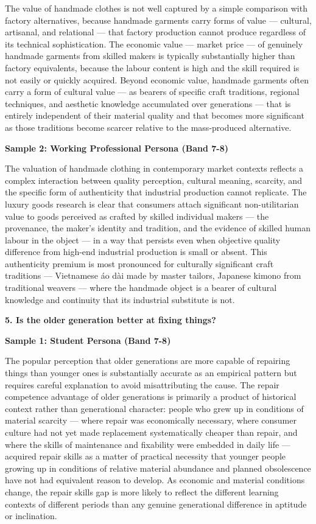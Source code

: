 The value of handmade clothes is not well captured by a simple comparison with factory alternatives, because handmade garments carry forms of value — cultural, artisanal, and relational — that factory production cannot produce regardless of its technical sophistication. The economic value — market price — of genuinely handmade garments from skilled makers is typically substantially higher than factory equivalents, because the labour content is high and the skill required is not easily or quickly acquired. Beyond economic value, handmade garments often carry a form of cultural value — as bearers of specific craft traditions, regional techniques, and aesthetic knowledge accumulated over generations — that is entirely independent of their material quality and that becomes more significant as those traditions become scarcer relative to the mass-produced alternative.

\textbf{Sample 2: Working Professional Persona (Band 7-8)}

The valuation of handmade clothing in contemporary market contexts reflects a complex interaction between quality perception, cultural meaning, scarcity, and the specific form of authenticity that industrial production cannot replicate. The luxury goods research is clear that consumers attach significant non-utilitarian value to goods perceived as crafted by skilled individual makers — the provenance, the maker's identity and tradition, and the evidence of skilled human labour in the object — in a way that persists even when objective quality difference from high-end industrial production is small or absent. This authenticity premium is most pronounced for culturally significant craft traditions — Vietnamese áo dài made by master tailors, Japanese kimono from traditional weavers — where the handmade object is a bearer of cultural knowledge and continuity that its industrial substitute is not.

\separator

\begin{ieltsquestion}
\textbf{5. Is the older generation better at fixing things?}
\end{ieltsquestion}
\textbf{Sample 1: Student Persona (Band 7-8)}

The popular perception that older generations are more capable of repairing things than younger ones is substantially accurate as an empirical pattern but requires careful explanation to avoid misattributing the cause. The repair competence advantage of older generations is primarily a product of historical context rather than generational character: people who grew up in conditions of material scarcity — where repair was economically necessary, where consumer culture had not yet made replacement systematically cheaper than repair, and where the skills of maintenance and fixability were embedded in daily life — acquired repair skills as a matter of practical necessity that younger people growing up in conditions of relative material abundance and planned obsolescence have not had equivalent reason to develop. As economic and material conditions change, the repair skills gap is more likely to reflect the different learning contexts of different periods than any genuine generational difference in aptitude or inclination.

